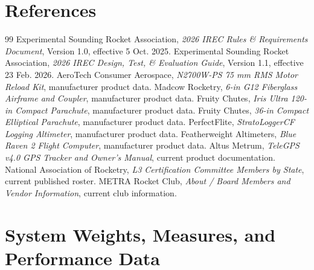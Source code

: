 \documentclass[10pt]{article}
\begin{document}
\section*{References}
\begin{thebibliography}{99}\small
{} Experimental Sounding Rocket Association, \textit{2026 IREC Rules \& Requirements Document}, Version 1.0, effective 5 Oct. 2025.
 Experimental Sounding Rocket Association, \textit{2026 IREC Design, Test, \& Evaluation Guide}, Version 1.1, effective 23 Feb. 2026.
 AeroTech Consumer Aerospace, \textit{N2700W-PS 75 mm RMS Motor Reload Kit}, manufacturer product data.
 Madcow Rocketry, \textit{6-in G12 Fiberglass Airframe and Coupler}, manufacturer product data.
 Fruity Chutes, \textit{Iris Ultra 120-in Compact Parachute}, manufacturer product data.
 Fruity Chutes, \textit{36-in Compact Elliptical Parachute}, manufacturer product data.
 PerfectFlite, \textit{StratoLoggerCF Logging Altimeter}, manufacturer product data.
 Featherweight Altimeters, \textit{Blue Raven 2 Flight Computer}, manufacturer product data.
 Altus Metrum, \textit{TeleGPS v4.0 GPS Tracker and Owner's Manual}, current product documentation.
 National Association of Rocketry, \textit{L3 Certification Committee Members by State}, current published roster.
 METRA Rocket Club, \textit{About / Board Members and Vendor Information}, current club information.
\end{thebibliography}

\clearpage
\appendix

\section{System Weights, Measures, and Performance Data}
\end{document}
